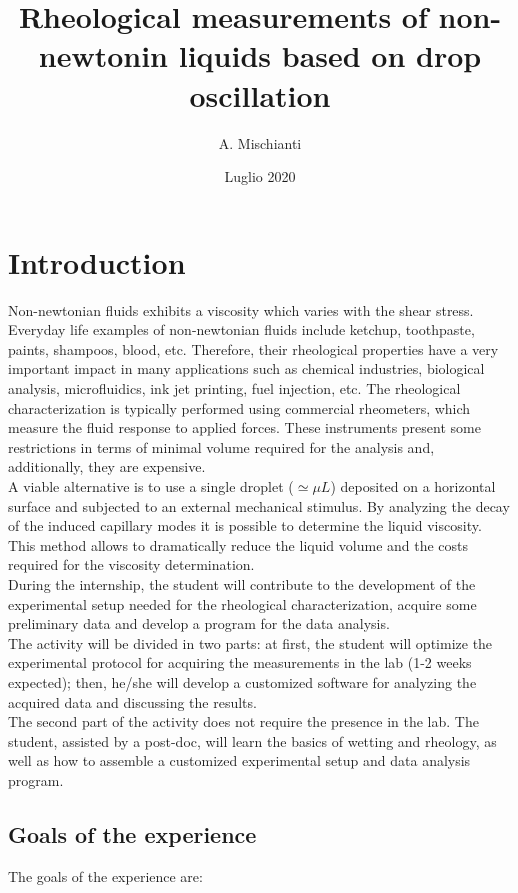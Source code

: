 \documentclass[letterpaper,12pt]{article}
\begin{document}
\title {Rheological measurements of non-newtonin liquids based on drop oscillation}
\author{A. Mischianti}
\date{Luglio 2020}
\maketitle



\section{Introduction}
Non-newtonian fluids exhibits a viscosity which varies with the shear stress. Everyday life examples of non-newtonian fluids include ketchup, toothpaste, paints, shampoos, blood, etc. Therefore, their rheological properties have a very important impact in many applications such as chemical industries, biological analysis, microfluidics, ink jet printing, fuel injection, etc. The rheological characterization is typically performed using commercial rheometers, which measure the fluid response to applied forces. These instruments present some restrictions in terms of minimal volume required for the analysis and, additionally, they are expensive. \\
A viable alternative is to use a single droplet ($\simeq \mu L$) deposited on a horizontal surface and subjected to an external mechanical stimulus. By analyzing the decay of the induced capillary modes it is possible to determine the liquid viscosity. This method allows to dramatically reduce the liquid volume and the costs required for the viscosity determination. \\
During the internship, the student will contribute to the development of the experimental setup needed for the rheological characterization, acquire some preliminary data and develop a program for the data analysis.\\

The activity will be divided in two parts: at first, the student will optimize the experimental protocol for acquiring the measurements in the lab (1-2 weeks expected); then, he/she will develop a customized software for analyzing the acquired data and discussing the results. \\
The second part of the activity does not require the presence in the lab. 
The student, assisted by a post-doc, will learn the basics of wetting and rheology, as well as how to assemble a customized experimental setup and data analysis program.
\subsection {Goals of the experience}
The goals of the experience are:
\end{document}
